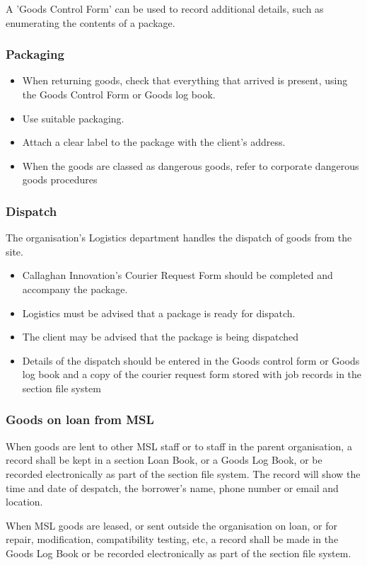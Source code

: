 A 'Goods Control Form' can be used to record additional details, such as enumerating the contents of a package. 

\subsubsection{Packaging}
\begin{itemize}
\item When returning goods, check that everything that arrived is present, using the Goods Control Form or Goods log book.
\item Use suitable packaging.
\item Attach a clear label to the package with the client's address.
\item When the goods are classed as dangerous goods, refer to corporate dangerous goods procedures
\end{itemize}

\subsubsection{Dispatch}
The organisation’s Logistics department handles the dispatch of goods from the site.
\begin{itemize}
\item Callaghan Innovation's Courier Request Form should be completed and accompany the package.
\item Logistics must be advised that a package is ready for dispatch.
\item The client may be advised that the package is being dispatched
\item Details of the dispatch should be entered in the Goods control form or Goods log book and a copy of the courier request form stored with job records in the section file system
\end{itemize}

\subsubsection{Goods on loan from MSL}
When goods are lent to other MSL staff or to staff in the parent organisation, a record shall be kept in a section Loan Book, or a Goods Log Book, or be recorded electronically as part of the section file system. The record will show the time and date of despatch, the borrower’s name, phone number or email and location.

When MSL goods are leased, or sent outside the organisation on loan, or for repair, modification, compatibility testing, etc, a record shall be made in the Goods Log Book or be recorded electronically as part of the section file system. 